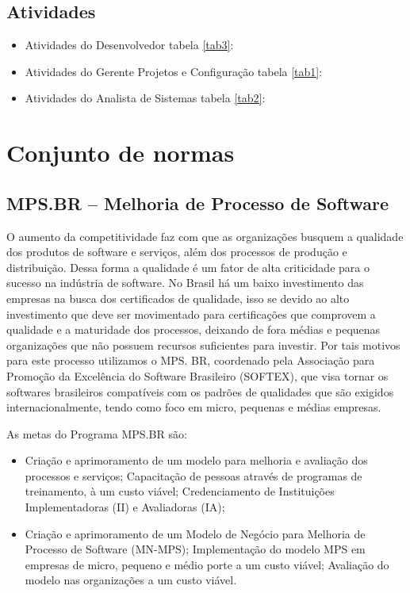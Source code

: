 \documentclass[	DIV=calc,%
							paper=a4,%
							fontsize=12pt,%
							onecolumn]{scrartcl}	 					%
\begin{document}
\subsection{Atividades}
\begin{itemize}
\item Atividades do Desenvolvedor tabela \ref{tab3}:

\item Atividades do Gerente Projetos e Configuração tabela \ref{tab1}:
\begin{landscape}

\end{landscape}
\item Atividades do Analista de Sistemas tabela \ref{tab2}:

\end{itemize}

\section{Conjunto de normas}

\subsection{MPS.BR – Melhoria de Processo de Software}
O aumento da competitividade faz com que as organizações busquem a qualidade dos produtos de software e serviços, além dos processos de produção e distribuição. Dessa forma a qualidade é um fator de alta criticidade para o sucesso na indústria de software.
No Brasil há um baixo investimento das empresas na busca dos certificados de qualidade, isso se devido ao alto investimento que deve ser movimentado para certificações que comprovem a qualidade e a maturidade dos processos, deixando de fora médias e pequenas organizações que não possuem recursos suficientes para investir.
Por tais motivos para este processo utilizamos o MPS. BR, coordenado pela Associação para Promoção da Excelência do Software Brasileiro (SOFTEX), que visa tornar os softwares brasileiros compatíveis com os padrões de qualidades que são exigidos internacionalmente, tendo como foco em micro, pequenas e médias empresas.

As metas do Programa MPS.BR são:
\begin{itemize}
    \item Criação e aprimoramento de um modelo para melhoria e avaliação dos processos e serviços; Capacitação de pessoas através de programas de treinamento, à um custo viável; Credenciamento de Instituições Implementadoras (II) e Avaliadoras (IA);
    
    \item Criação e aprimoramento de um Modelo de Negócio para Melhoria de Processo de Software (MN-MPS); Implementação do modelo MPS em empresas de micro, pequeno e médio porte a um custo viável; Avaliação do modelo nas organizações a um custo viável.
\end{itemize}
\end{document}
